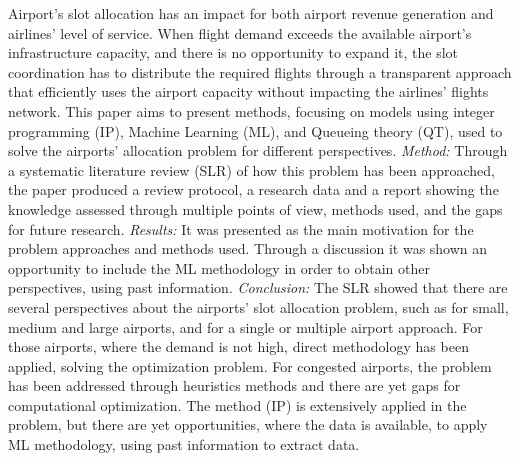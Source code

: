 Airport's slot allocation has an impact for both airport revenue generation and airlines' level of service. When flight demand exceeds the available airport's infrastructure capacity, and there is no opportunity to expand it, the slot coordination has to distribute the required flights through a transparent approach that efficiently uses the airport capacity without impacting the airlines' flights network. This paper aims to present methods, focusing on models using integer programming (IP), Machine Learning (ML), and Queueing theory (QT), used to solve the airports' allocation problem for different perspectives.
\textit{Method:} Through a systematic literature review (SLR) of how this problem has been approached, the paper produced a review protocol, a research data and a report showing the knowledge assessed through multiple points of view, methods used, and the gaps for future research.
\textit{Results:} It was presented as the main motivation for the problem approaches and methods used. Through a discussion it was shown an opportunity to include the ML methodology in order to obtain other perspectives, using past information.
\textit{Conclusion:} The SLR showed that there are several perspectives about the airports' slot allocation problem, such as for small, medium and large airports, and for a single or multiple airport approach. For those airports, where the demand is not high, direct methodology has been applied, solving the optimization problem. For congested airports, the problem has been addressed through heuristics methods and there are yet gaps for computational optimization. The method (IP) is extensively applied in the problem, but there are yet opportunities, where the data is available, to apply ML methodology, using past information to extract data.